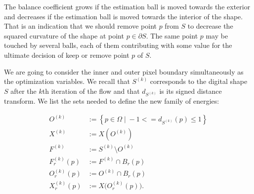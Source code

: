 The balance coefficient grows if the estimation ball is moved towards the exterior and decreases if the estimation ball is moved towards the interior of the shape. That is an indication that we should remove point $p$ from $S$ to decrease the squared curvature of the shape at point $p \in \partial S$. The same point $p$ may be touched by several balls, each of them contributing with some value for the ultimate decision of keep or remove point $p$ of $S$. 


%
%
%
%
%
%
%



We are going to consider the inner and outer pixel boundary simultaneously as the optimization variables. We recall that $S^{(k)}$ corresponds to the digital shape $S$ after the $k$th iteration of the flow and that $d_{S^{(k)}}$ is its signed distance transform. We list the sets needed to define the new family of energies:

\begin{align*}
	O^{(k)} &:=\left\{ p \in \Omega \; | \; -1 <= d_{S^{(k)}}(p) \leq 1 \right\}\\
	X^{(k)} &:= X(O^{(k)})  \\
	F^{(k)} &:= S^{(k)} \setminus O^{(k)} \\
	F_r^{(k)}(p) &:= F^{(k)} \cap B_r(p)\\
	O_r^{(k)}(p) &:= O^{(k)} \cap B_r(p) \\
	X_r^{(k)}(p) &:= X\big( O_r^{(k)}(p) \big).
\end{align*}

